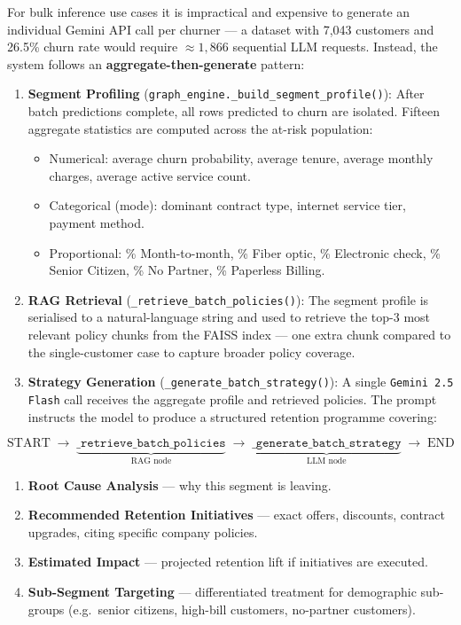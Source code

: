 \documentclass[12pt,a4paper]{article}
\begin{document}
For bulk inference use cases it is impractical and expensive to generate an individual Gemini API call per churner --- a dataset with 7,043 customers and 26.5\% churn rate would require $\approx 1{,}866$ sequential LLM requests. Instead, the system follows an \textbf{aggregate-then-generate} pattern:

\begin{enumerate}[leftmargin=2em]
    \item \textbf{Segment Profiling} (\texttt{graph\_engine.\_build\_segment\_profile()}): After batch predictions complete, all rows predicted to churn are isolated. Fifteen aggregate statistics are computed across the at-risk population:
    \begin{itemize}[leftmargin=2em]
        \item Numerical: average churn probability, average tenure, average monthly charges, average active service count.
        \item Categorical (mode): dominant contract type, internet service tier, payment method.
        \item Proportional: \% Month-to-month, \% Fiber optic, \% Electronic check, \% Senior Citizen, \% No Partner, \% Paperless Billing.
    \end{itemize}
    \item \textbf{RAG Retrieval} (\texttt{\_retrieve\_batch\_policies()}): The segment profile is serialised to a natural-language string and used to retrieve the top-3 most relevant policy chunks from the FAISS index --- one extra chunk compared to the single-customer case to capture broader policy coverage.
    \item \textbf{Strategy Generation} (\texttt{\_generate\_batch\_strategy()}): A single \texttt{Gemini 2.5 Flash} call receives the aggregate profile and retrieved policies. The prompt instructs the model to produce a structured retention programme covering:
\end{enumerate}

\[
\text{START} \;\rightarrow\; \underbrace{\texttt{\_retrieve\_batch\_policies}}_{\text{RAG node}} \;\rightarrow\; \underbrace{\texttt{\_generate\_batch\_strategy}}_{\text{LLM node}} \;\rightarrow\; \text{END}
\]

\begin{tcolorbox}[colback=lightgray, colframe=primary, title={\textbf{Batch Strategy Output Structure}}]
\begin{enumerate}[leftmargin=1.5em, itemsep=2pt]
    \item \textbf{Root Cause Analysis} --- why this segment is leaving.
    \item \textbf{Recommended Retention Initiatives} --- exact offers, discounts, contract upgrades, citing specific company policies.
    \item \textbf{Estimated Impact} --- projected retention lift if initiatives are executed.
    \item \textbf{Sub-Segment Targeting} --- differentiated treatment for demographic sub-groups (e.g.\ senior citizens, high-bill customers, no-partner customers).
\end{enumerate}
\end{tcolorbox}
\end{document}
